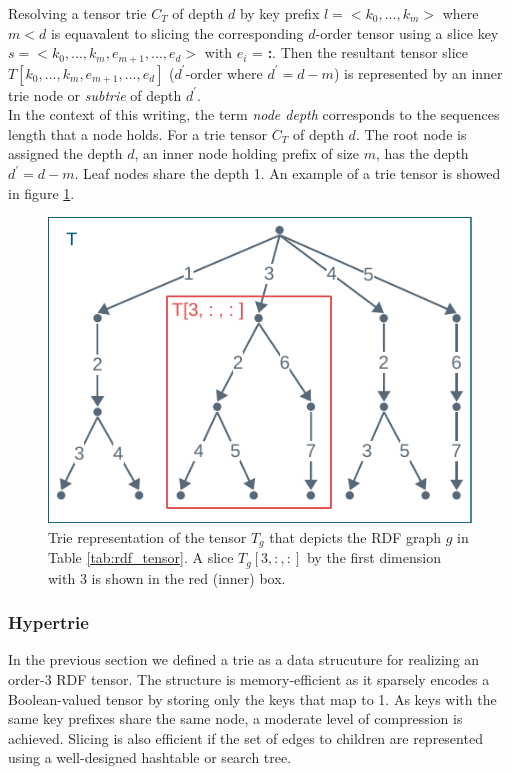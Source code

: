 Resolving a tensor trie $C_T$ of depth $d$ by key prefix $l = <k_0, ..., k_m>$ where $m<d$ is equavalent to slicing the corresponding $d$-order tensor using a slice key $s = <k_0, ..., k_m, e_{m+1}, ...,e_d>$ with $e_i$ = \textbf{:}. Then the resultant tensor slice $T[k_0, ..., k_m, e_{m+1}, ...,e_d]$ ($d^{'}$-order where $d^{'}=d-m$) is represented by an inner trie node or \textit{subtrie} of depth $d^{'}$. \\

In the context of this writing, the term \textit{node depth} corresponds to the sequences length that a node holds. For a trie tensor $C_T$ of depth $d$. The root node is assigned the depth $d$, an inner node holding prefix of size $m$, has the depth $d^{'}=d-m$. Leaf nodes share the depth 1. An example of a trie tensor is showed in figure \ref{fig:rdf_trie}.  \\

\begin{figure}[h]
	\centering
	\includegraphics{figures/chapter2/trie4}
	\caption{Trie representation of the tensor $T_g$ that depicts the RDF graph $g$ in  Table \ref{tab:rdf_tensor}. A slice $T_g[3, :, :]$ by the first dimension with 3 is shown in the red (inner) box.}
	\label{fig:rdf_trie}
\end{figure}
\clearpage


\subsubsection{Hypertrie}
In the previous section we defined a trie as a data strucuture for realizing an order-3 RDF tensor. The structure is memory-efficient as it sparsely encodes a Boolean-valued tensor by storing only the keys that map to 1. As keys with the same key prefixes share the same node, a moderate level of compression is achieved. Slicing is also efficient if the set of edges to children are represented using a well-designed hashtable or search tree\cite{bras}. \\

